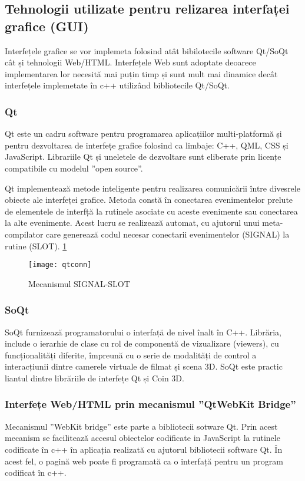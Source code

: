 \subsection{Tehnologii utilizate pentru relizarea interfaței grafice (GUI)}
\par Interfețele grafice se vor implemeta folosind atât bibilotecile software Qt/SoQt cât și tehnologii Web/HTML. Interfețele Web sunt adoptate deoarece implementarea lor necesită mai puțin timp și sunt mult mai dinamice decât interfețele implemetate în c++ utilizând bibliotecile Qt/SoQt.

\subsubsection{Qt}

\par Qt este un cadru software pentru programarea aplicațiilor multi-platformă și pentru dezvoltarea de interfețe grafice folosind  ca limbaje: C++, QML, CSS și JavaScript. Librariile Qt și uneletele de dezvoltare sunt eliberate prin licențe compatibile cu modelul ”open source”. 
\par Qt implementează metode inteligente pentru realizarea comunicării între divesrele obiecte ale interfeței grafice. Metoda constă în conectarea evenimentelor prelute de elementele de interfță la rutinele asociate cu aceste evenimente sau conectarea la alte evenimente. Acest lucru se realizează automat, cu ajutorul unui meta-compilator care generează codul necesar conectarii evenimentelor (SIGNAL) la rutine (SLOT). \ref{fig:sig-slot} \cite{QT}

\begin{figure}[h]
    \centering
    \texttt{[image: qtconn]}
    \caption{Mecanismul SIGNAL-SLOT}
    \label{fig:sig-slot}
\end{figure}

\newpage
\subsubsection{SoQt}
\par SoQt furnizează programatorului o interfață de nivel înalt în C++. Librăria, include o ierarhie de clase cu rol de componentă de vizualizare (viewers), cu funcționalități diferite, împreună cu o serie de modalități de control a interacțiunii dintre camerele virtuale de filmat și scena 3D. SoQt este practic liantul dintre librăriile de interfețe Qt și Coin 3D.
\subsubsection{Interfețe Web/HTML prin mecanismul ”QtWebKit Bridge”}
\par Mecanismul ”WebKit bridge” este parte a bibliotecii sotware Qt. Prin acest mecanism se facilitează accesul obiectelor codificate in JavaScript la rutinele codificate în c++ în aplicația realizată cu ajutorul bibliotecii software Qt. În acest fel, o pagină web poate fi programată ca o interfață pentru un program codificat în c++. \cite{QT} 

